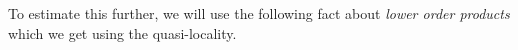 To estimate this further, we will use the following fact about {\em lower order products}
which we get using the quasi-locality.

% 
%  
